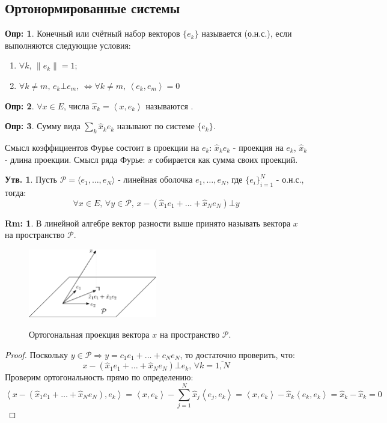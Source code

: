 \documentclass[12pt]{article}
\newcommand{\MP}{\mathcal{P}}
\theoremstyle{definition}
\newtheorem{defn}{Опр:}
\newtheorem{rem}{Rm:}
\newtheorem{prop}{Утв.}
\newcommand{\ddsum}[2]{\displaystyle\sum\limits_{#1}^{#2}}
\newcommand{\inner}[2]{\left\langle #1, #2 \right\rangle }
\begin{document}
\subsection*{Ортонормированные системы}
\begin{defn}
	Конечный или счётный набор векторов $\{e_k\}$ называется  (о.н.с.), если выполняются следующие условия:
	\begin{enumerate}[label=(\arabic*)]
		\item $\forall k, \, \|e_k\| = 1$;
		\item $ \forall k \neq m, \, e_k \bot e_m, \, \Leftrightarrow  \forall k \neq m, \, \inner{e_k}{e_m} = 0$
	\end{enumerate}
\end{defn}
\begin{defn}
	$\forall x \in E$, числа $\hat{x}_k = \inner{x}{e_k}$ называются . 
\end{defn}
\begin{defn}
	Сумму вида $\ddsum{k}{}\hat{x}_ke_k$ называют  по системе $\{e_k\}$.
\end{defn}
Смысл коэффициентов Фурье состоит в проекции на $e_k$: $\hat{x}_k e_k$ - проекция на $e_k$, $\hat{x}_k$ - длина проекции. Смысл ряда Фурье: $x$ собирается как сумма своих проекций.

\begin{prop}
	Пусть $\MP = \langle e_1, \dotsc, e_N \rangle$ - линейная оболочка $e_1, \dotsc, e_N$, где $\{e_i\}_{i =1}^{N}$ - о.н.с., тогда:
	$$
		\forall x \in E, \, \forall y \in \MP, \, x - (\hat{x}_1 e_1 + \dotsc + \hat{x}_N e_N) \bot y
	$$
\end{prop}
\begin{rem}
	В линейной алгебре вектор разности выше принято называть  вектора $x$ на пространство $\MP$.
\end{rem}
\begin{figure}[H]
	\centering
	\includegraphics[width=0.5\textwidth]{MA3L27_2.eps}
	\label{MA3L27_2}
	\caption{Ортогональная проекция вектора $x$ на пространство $\MP$.}
	\label{fig: Проекция на пространство}
\end{figure}
\begin{proof}
	Поскольку $y \in \MP \Rightarrow y = c_1 e_1 + \dotsc + c_N e_N$, то достаточно проверить, что: 
	$$
		x - (\hat{x}_1 e_1 + \dotsc + \hat{x}_N e_N) \bot e_k, \, \forall k = \overline{1,N}
	$$
	Проверим ортогональность прямо по определению:
	$$
		\inner{x - (\hat{x}_1 e_1 + \dotsc + \hat{x}_N e_N)}{e_k} = \inner{x}{e_k} - \ddsum{j = 1}{N}\hat{x}_j\inner{e_j}{e_k} = \inner{x}{e_k} - \hat{x}_k\inner{e_k}{e_k} = \hat{x}_k - \hat{x}_k = 0
	$$
\end{proof}
\end{document}

